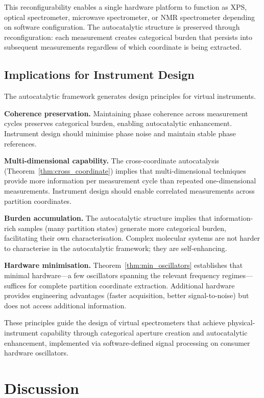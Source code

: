 \documentclass[twocolumn,10pt,a4paper]{article}
\theoremstyle{definition}
\theoremstyle{remark}
\begin{document}
This reconfigurability enables a single hardware platform to function as XPS, optical spectrometer, microwave spectrometer, or NMR spectrometer depending on software configuration. The autocatalytic structure is preserved through reconfiguration: each measurement creates categorical burden that persists into subsequent measurements regardless of which coordinate is being extracted.

\subsection{Implications for Instrument Design}

The autocatalytic framework generates design principles for virtual instruments.

\textbf{Coherence preservation.} Maintaining phase coherence across measurement cycles preserves categorical burden, enabling autocatalytic enhancement. Instrument design should minimise phase noise and maintain stable phase references.

\textbf{Multi-dimensional capability.} The cross-coordinate autocatalysis (Theorem~\ref{thm:cross_coordinate}) implies that multi-dimensional techniques provide more information per measurement cycle than repeated one-dimensional measurements. Instrument design should enable correlated measurements across partition coordinates.

\textbf{Burden accumulation.} The autocatalytic structure implies that information-rich samples (many partition states) generate more categorical burden, facilitating their own characterisation. Complex molecular systems are not harder to characterise in the autocatalytic framework; they are self-enhancing.

\textbf{Hardware minimisation.} Theorem~\ref{thm:min_oscillators} establishes that minimal hardware—a few oscillators spanning the relevant frequency regimes—suffices for complete partition coordinate extraction. Additional hardware provides engineering advantages (faster acquisition, better signal-to-noise) but does not access additional information.

These principles guide the design of virtual spectrometers that achieve physical-instrument capability through categorical aperture creation and autocatalytic enhancement, implemented via software-defined signal processing on consumer hardware oscillators.


\section{Discussion}
\label{sec:discussion}
\end{document}
